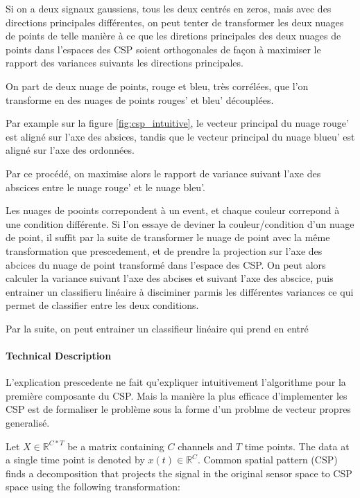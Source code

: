 Si on a deux signaux gaussiens, tous les deux centrés en zeros, mais avec des directions principales différentes, on peut tenter de transformer les deux nuages de points de telle manière à ce que les diretions principales des deux nuages de points dans l'espaces des CSP soient orthogonales de façon à maximiser le rapport des variances suivants les directions principales.

On part de deux nuage de points, rouge et bleu, très corrélées, que l'on transforme en des nuages de points rouges' et bleu' découplées.

Par example sur la figure \ref{fig:csp_intuitive}, le vecteur principal du nuage rouge' est aligné sur l'axe des absices, tandis que le vecteur principal du nuage blueu' est aligné sur l'axe des ordonnées.

Par ce procédé, on maximise alors le rapport de variance suivant l'axe des abscices entre le nuage rouge' et le nuage bleu'.


Les nuages de pooints correpondent à un event, et chaque couleur correpond à une condition différente. Si l'on essaye de deviner la couleur/condition d'un nuage de point, il suffit par la suite de transformer le nuage de point avec la même transformation que prescedement, et de prendre la projection sur l'axe des abcices du nuage de point transformé dans l'espace des CSP. On peut alors calculer la variance suivant l'axe des abcises et suivant l'axe des abscice, puis entrainer un classifieru linéaire à disciminer parmis les différentes variances ce qui permet de classifier entre les deux conditions.


Par la suite, on peut entrainer un classifieur linéaire qui prend en entré

\paragraph{Technical Description}

L'explication prescedente ne fait qu'expliquer intuitivement l'algorithme pour la première composante du CSP. Mais la manière la plus efficace d'implementer les CSP est de formaliser le problème sous la forme d'un problme de vecteur propres generalisé.

Let $X \in \mathbb{R}^{C * T}$ be a matrix containing  $C$ channels and $T$ time points. The data at a single time point is denoted by $x(t) \in  \mathbb{R}^{C}$. Common spatial pattern (CSP) finds a decomposition that projects the signal in the original sensor space to CSP space using the following transformation:

